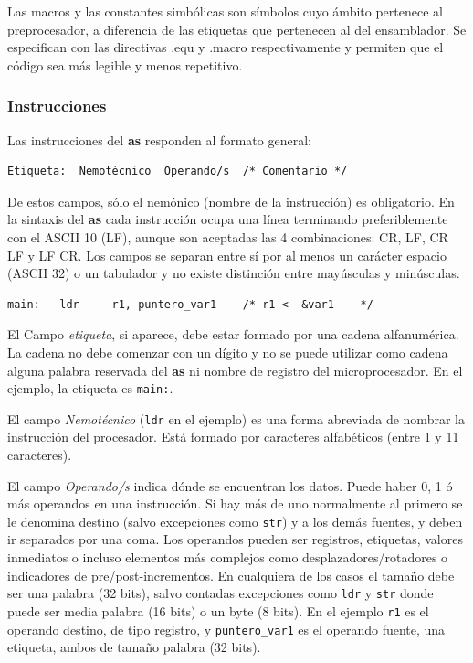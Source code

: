 Las macros y las constantes simbólicas son símbolos cuyo ámbito pertenece al preprocesador,
a diferencia de las etiquetas que pertenecen al del ensamblador. Se especifican con las
directivas .equ y .macro respectivamente y permiten que el código sea más legible y menos
repetitivo.

\subsubsection{Instrucciones}

Las instrucciones del {\bf as} responden al formato general:


\begin{lstlisting}
Etiqueta:  Nemotécnico  Operando/s  /* Comentario */
\end{lstlisting}

De estos campos, sólo el nemónico (nombre de la instrucción) es obligatorio. En
la sintaxis del {\bf as} cada instrucción ocupa una línea terminando preferiblemente
con el ASCII 10 (LF), aunque son aceptadas las 4 combinaciones: CR, LF, CR LF y LF CR.
Los campos se separan entre sí por al menos un carácter espacio (ASCII 32) o un tabulador
y no existe distinción entre mayúsculas y minúsculas.

\begin{lstlisting}
main:   ldr     r1, puntero_var1    /* r1 <- &var1    */
\end{lstlisting}

El Campo {\it etiqueta}, si aparece, debe estar formado por una
cadena alfanumérica. La cadena no debe comenzar con un dígito y no se puede
utilizar como cadena alguna palabra reservada del {\bf as} ni nombre
de registro del microprocesador. En el ejemplo, la etiqueta es
{\tt main:}.

El campo \textit{Nemotécnico} ({\tt ldr} en el ejemplo) es una forma
abreviada de nombrar la instrucción del procesador.
Está formado por caracteres alfabéticos (entre 1 y 11 caracteres).

El campo \textit{Operando/s} indica dónde se encuentran los datos.
Puede haber 0, 1 ó más operandos en una instrucción. Si hay más de uno
normalmente al primero se le denomina destino (salvo excepciones como {\tt str})
y a los demás fuentes, y deben ir separados por una coma.
Los operandos pueden ser registros, etiquetas, valores inmediatos o incluso
elementos más complejos como desplazadores/rotadores o indicadores de
pre/post-incrementos. En cualquiera de los casos el tamaño debe ser una
palabra (32 bits), salvo contadas excepciones como {\tt ldr} y {\tt str}
donde puede ser media palabra (16 bits) o un byte (8 bits).
En el ejemplo {\tt r1} es el operando destino, de tipo registro,
y {\tt puntero\_var1} es el operando fuente, una etiqueta, ambos
de tamaño palabra (32 bits).

